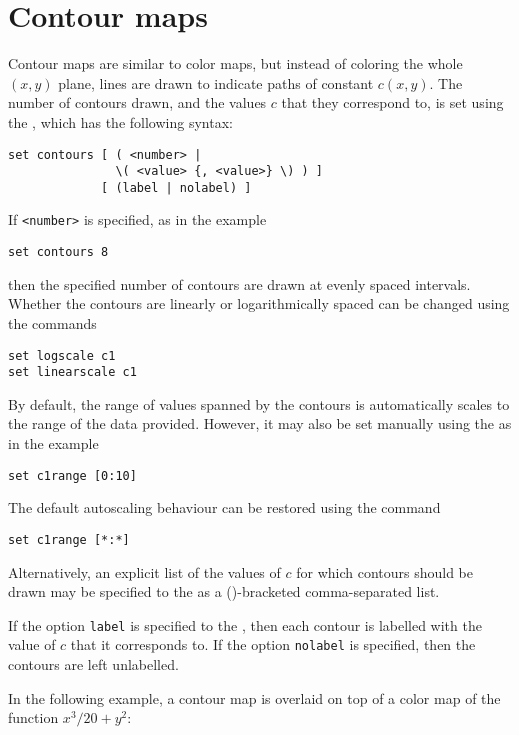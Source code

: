 \section{Contour maps}
\label{sec:contourmaps}

Contour maps are similar to color maps, but instead of coloring the whole
$(x,y)$ plane, lines are drawn to indicate paths of constant $c(x,y)$. The
number of contours drawn, and the values $c$ that they correspond to, is set
using the , which has the following syntax:

\begin{verbatim}
set contours [ ( <number> |
               \( <value> {, <value>} \) ) ]
             [ (label | nolabel) ]
\end{verbatim}

If {\tt <number>} is specified, as in the example
\begin{verbatim}
set contours 8
\end{verbatim}
then the specified number of contours are drawn at evenly spaced intervals.
Whether the contours are linearly or logarithmically spaced can be changed
using the commands
\begin{verbatim}
set logscale c1
set linearscale c1
\end{verbatim}
By default, the range of values spanned by the contours is automatically scales
to the range of the data provided. However, it may also be set manually using
the  as in the example
\begin{verbatim}
set c1range [0:10]
\end{verbatim}
The default autoscaling behaviour can be restored using the command
\begin{verbatim}
set c1range [*:*]
\end{verbatim}

Alternatively, an explicit list of the values of $c$ for which contours should
be drawn may be specified to the  as a ()-bracketed
comma-separated list.

If the option {\tt label} is specified to the , then each
contour is labelled with the value of $c$ that it corresponds to. If the option
{\tt nolabel} is specified, then the contours are left unlabelled.

In the following example, a contour map is overlaid on top of a color map of
the function $x^3/20+y^2$:

\vspace{2mm}

\vspace{2mm}

